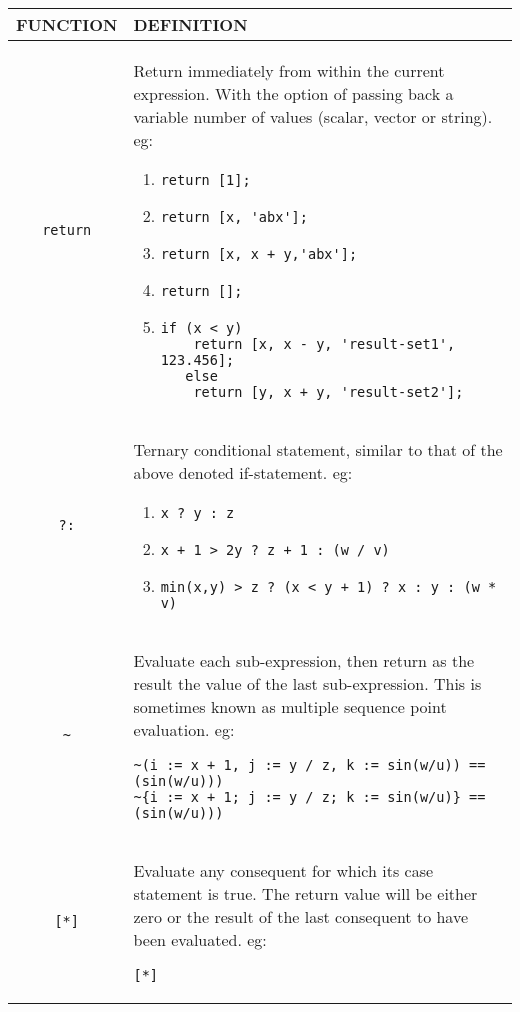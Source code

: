 \begin{tabular}{|c|p{}|}
\hline
FUNCTION& DEFINITION\\
  \hline
\verb'return'& Return immediately from within the current expression.
With the option of passing back a variable number of
values (scalar, vector or string). eg:
\begin{enumerate}
\item\verb"return [1]; "                                     
\item\verb"return [x, 'abx'];"                              
\item\verb"return [x, x + y,'abx'];"                         
\item\verb"return [];"                                       
\item
\begin{verbatim}
if (x < y)                                       
    return [x, x - y, 'result-set1', 123.456];      
   else                                             
    return [y, x + y, 'result-set2'];               
\end{verbatim}
\end{enumerate}
\\
\verb'?:'& Ternary conditional statement, similar to that of the
above denoted if-statement.                     
eg:
\begin{enumerate}
\item\verb"x ? y : z"                                    
\item\verb"x + 1 > 2y ? z + 1 : (w / v)"                 
\item\verb"min(x,y) > z ? (x < y + 1) ? x : y : (w * v)"
\end{enumerate}
\\
\verb'~'& Evaluate each sub-expression, then return as the result 
the value of the last sub-expression. This is sometimes
known as multiple sequence point evaluation.           
eg:                                                    
\begin{verbatim}
~(i := x + 1, j := y / z, k := sin(w/u)) == (sin(w/u)))
~{i := x + 1; j := y / z; k := sin(w/u)} == (sin(w/u)))
\end{verbatim}
\\
\verb'[*]'& Evaluate any consequent for which its case statement is 
true. The return value will be either zero or the result
of the last consequent to have been evaluated.          
eg:
\begin{verbatim}
[*]                                                     

\end{verbatim}
\end{tabular}
